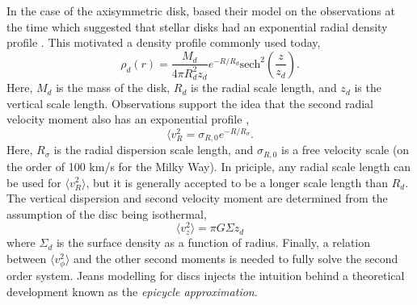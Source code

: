 In the case of the axisymmetric disk, \citet{hernquist_1993} based their model on the observations at the time which suggested that stellar disks had an exponential radial density profile \citep{freeman_1970}. This motivated a density profile commonly used today,
\begin{equation}
\rho_d(r) = \frac{M_d}{4 \pi R_d^2 z_d} e^{-R/R_d} \text{sech}^2\left(\frac{z}{z_d} \right). 
\end{equation}
Here, $M_d$ is the mass of the disk, $R_d$ is the radial scale length, and $z_d$ is the vertical scale length.
Observations support the idea that the second radial velocity moment also has an exponential profile \citep{van_der_kruit_searle_1981, lewis_freeman_1989},
\begin{equation}
\langle v_R^2  = \sigma_{R,0} e^{-R/R_\sigma}.
\end{equation}
Here, $R_\sigma$ is the radial dispersion scale length, and $\sigma_{R,0}$ is a free velocity scale (on the order of 100 km/s for the Milky Way). In  priciple, any radial scale length can be used for $\langle v_R^2 \rangle$, but it is generally accepted to be a longer scale length than $R_d$. The vertical dispersion and second velocity moment are determined from the assumption of the disc being isothermal,
\begin{equation}
\langle v_z^2 \rangle = \pi G \Sigma z_d
\end{equation}
where $\Sigma_d$ is the surface density as a function of radius. Finally, a relation between $\langle v_\phi^2 \rangle$ and the other second moments is needed to fully solve the second order system. Jeans modelling for discs injects the intuition behind a theoretical development known as the \textit{epicycle approximation}. 

